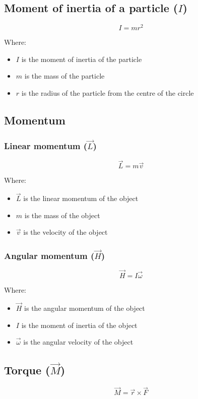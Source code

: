 \documentclass[11pt]{article}
\begin{document}
\subsection{Moment of inertia of a particle (\(I\))}
\label{sec:orgc7ffd21}
\[I = mr^2\]

Where:
\begin{itemize}
\item \(I\) is the moment of inertia of the particle
\item \(m\) is the mass of the particle
\item \(r\) is the radius of the particle from the centre of the circle
\end{itemize}

\subsection{Momentum}
\label{sec:org98eb1ce}

\subsubsection{Linear momentum (\(\vec{L}\))}
\label{sec:org2d8fdac}
\[\vec{L} = m \vec{v}\]

Where:
\begin{itemize}
\item \(\vec{L}\) is the linear momentum of the object
\item \(m\) is the mass of the object
\item \(\vec{v}\) is the velocity of the object
\end{itemize}

\subsubsection{Angular momentum (\(\vec{H}\))}
\label{sec:orgbd52309}
\[\vec{H} = I \vec{\omega}\]

Where:
\begin{itemize}
\item \(\vec{H}\) is the angular momentum of the object
\item \(I\) is the moment of inertia of the object
\item \(\vec{\omega}\) is the angular velocity of the object
\end{itemize}

\subsection{Torque (\(\vec{M}\))}
\label{sec:orgaf943d7}
\[\vec{M} = \vec{r} \times \vec{F}\]
\end{document}
